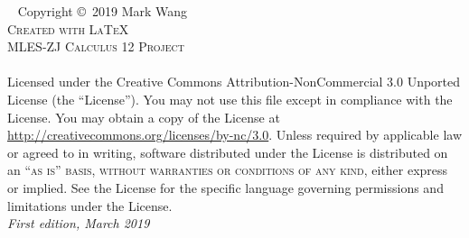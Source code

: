 \documentclass[11pt,fleqn,openany]{book} %
\begin{document}







\newpage
~\vfill
\thispagestyle{empty}
\noindent Copyright \copyright\ 2019 Mark Wang\\ %
\noindent \textsc{Created with \LaTeX}\\ %
\noindent \textsc{MLES-ZJ Calculus 12 Project}\\\\
\noindent Licensed under the Creative Commons Attribution-NonCommercial 3.0 Unported License (the ``License''). You may not use this file except in compliance with the License. You may obtain a copy of the License at \url{http://creativecommons.org/licenses/by-nc/3.0}. Unless required by applicable law or agreed to in writing, software distributed under the License is distributed on an \textsc{``as is'' basis, without warranties or conditions of any kind}, either express or implied. See the License for the specific language governing permissions and limitations under the License.\\ %
\noindent \textit{First edition, March 2019} %





\end{document}
